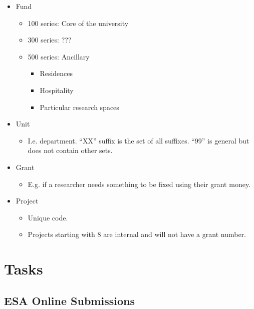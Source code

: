 \documentclass[
  letterpaper,
  DIV=11,
  numbers=noendperiod,
  oneside]{scrreprt}
\providecommand{\tightlist}{%
  \setlength{\itemsep}{0pt}\setlength{\parskip}{0pt}}\usepackage{longtable,booktabs,array}
\begin{document}
\begin{itemize}
\item
  Fund

  \begin{itemize}
  \item
    100 series: Core of the university
  \item
    300 series: ???
  \item
    500 series: Ancillary

    \begin{itemize}
    \item
      Residences
    \item
      Hospitality
    \item
      Particular research spaces
    \end{itemize}
  \end{itemize}
\item
  Unit

  \begin{itemize}
  \tightlist
  \item
    I.e. department. ``XX'' suffix is the set of all suffixes. ``99'' is
    general but does not contain other sets.
  \end{itemize}
\item
  Grant

  \begin{itemize}
  \tightlist
  \item
    E.g. if a researcher needs something to be fixed using their grant
    money.
  \end{itemize}
\item
  Project

  \begin{itemize}
  \item
    Unique code.
  \item
    Projects starting with 8 are internal and will not have a grant
    number.
  \end{itemize}
\end{itemize}

\part{Tasks}

\hypertarget{esa-online-submissions}{%
\chapter{ESA Online Submissions}\label{esa-online-submissions}}
\end{document}
